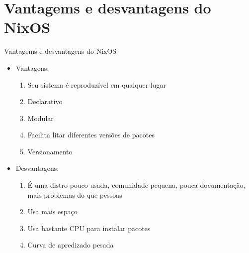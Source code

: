 \documentclass[presentation]{beamer}
\begin{document}
\section{Vantagems e desvantagens do NixOS}
\label{sec:orge503c54}
\begin{frame}[label={sec:org9a8d8c3}]{Vantagems e desvantagens do NixOS}
\begin{itemize}
\item Vantagens:
\begin{enumerate}
\item Seu sistema é reproduzível em qualquer lugar
\item Declarativo
\item Modular
\item Facilita litar diferentes versões de pacotes
\item Versionamento
\end{enumerate}
\item Desvantagens:
\begin{enumerate}
\item É uma distro pouco usada, comunidade pequena, pouca documentação, mais problemas do que pessoas
\item Usa mais espaço
\item Usa bastante CPU para instalar pacotes
\item Curva de apredizado pesada
\end{enumerate}
\end{itemize}
\end{frame}
\end{document}
